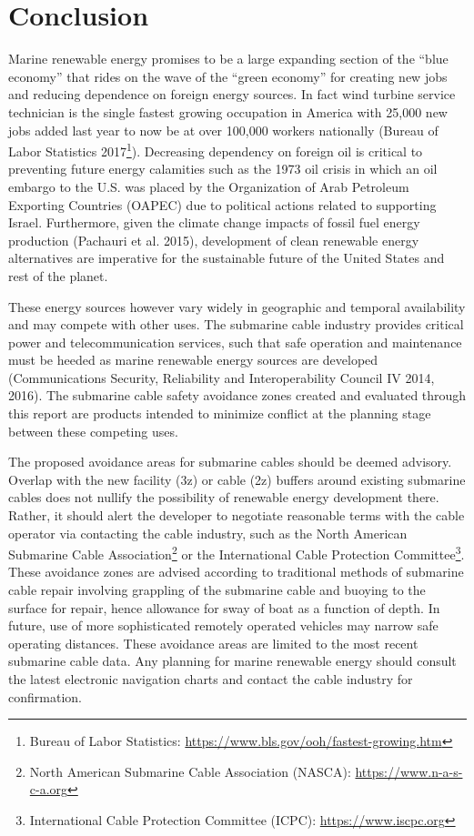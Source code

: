 \documentclass[]{article}
\let\rmarkdownfootnote\footnote%
\def\footnote{\protect\rmarkdownfootnote}
\begin{document}
\hypertarget{conclusion}{%
\section{Conclusion}\label{conclusion}}

Marine renewable energy promises to be a large expanding section of the
``blue economy'' that rides on the wave of the ``green economy'' for
creating new jobs and reducing dependence on foreign energy sources. In
fact wind turbine service technician is the single fastest growing
occupation in America with 25,000 new jobs added last year to now be at
over 100,000 workers nationally (Bureau of Labor Statistics
2017\footnote{Bureau of Labor Statistics:
  \url{https://www.bls.gov/ooh/fastest-growing.htm}}). Decreasing
dependency on foreign oil is critical to preventing future energy
calamities such as the 1973 oil crisis in which an oil embargo to the
U.S. was placed by the Organization of Arab Petroleum Exporting
Countries (OAPEC) due to political actions related to supporting Israel.
Furthermore, given the climate change impacts of fossil fuel energy
production (Pachauri et al. 2015), development of clean renewable energy
alternatives are imperative for the sustainable future of the United
States and rest of the planet.

These energy sources however vary widely in geographic and temporal
availability and may compete with other uses. The submarine cable
industry provides critical power and telecommunication services, such
that safe operation and maintenance must be heeded as marine renewable
energy sources are developed (Communications Security, Reliability and
Interoperability Council IV 2014, 2016). The submarine cable safety
avoidance zones created and evaluated through this report are products
intended to minimize conflict at the planning stage between these
competing uses.

The proposed avoidance areas for submarine cables should be deemed
advisory. Overlap with the new facility (3z) or cable (2z) buffers
around existing submarine cables does not nullify the possibility of
renewable energy development there. Rather, it should alert the
developer to negotiate reasonable terms with the cable operator via
contacting the cable industry, such as the North American Submarine
Cable Association\footnote{North American Submarine Cable Association
  (NASCA): \url{https://www.n-a-s-c-a.org}} or the International Cable
Protection Committee\footnote{International Cable Protection Committee
  (ICPC): \url{https://www.iscpc.org}}. These avoidance zones are
advised according to traditional methods of submarine cable repair
involving grappling of the submarine cable and buoying to the surface
for repair, hence allowance for sway of boat as a function of depth. In
future, use of more sophisticated remotely operated vehicles may narrow
safe operating distances. These avoidance areas are limited to the most
recent submarine cable data. Any planning for marine renewable energy
should consult the latest electronic navigation charts and contact the
cable industry for confirmation.
\end{document}
